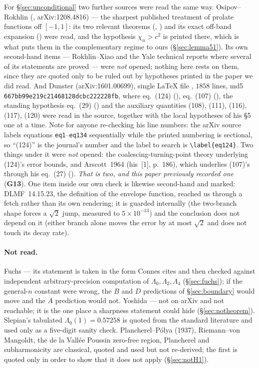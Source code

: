 \documentclass[11pt,a4paper]{article}
\theoremstyle{plain}
\theoremstyle{definition}
\theoremstyle{remark}
\newcommand{\file}[1]{\path{#1}}
\begin{document}
For \S\ref{sec:unconditional} two further sources were read the same way.
Osipov--Rokhlin \cite{OsipovRokhlin2013} (\file{test12_arxiv.tex},
arXiv:1208.4816) --- the sharpest published treatment of prolate functions off
$[-1,1]$: its two relevant theorems (\file{:2485}, \file{:2497}) and its exact
off-band expansion (\file{:4350}) were read, and the hypothesis
$\chi_n>c^2$ is printed there, which is what puts them in the complementary
regime to ours (\S\ref{sec:lemma51}).  Its own second-hand items --- Rokhlin--Xiao
and the Yale technical reports where several of its statements are proved ---
were \emph{not} opened; nothing here rests on them, since they are quoted only
to be ruled out by hypotheses printed in the paper we did read.  And Dunster
\cite{Dunster2017} (arXiv:1601.00699), single \LaTeX{} file
\file{PSWF_JCA.tex}, $1858$ lines, md5
\texttt{667bb99e219c21468128dcbc222228fb}, where eq.~(124) (\file{:1426}),
eq.~(107) (\file{:1296}), the standing hypothesis eq.~(29) (\file{:466}) and
the auxiliary quantities (108), (111), (116), (117), (120) were read in the
source, together with the local hypotheses of his \S5 one at a time.  Note for
anyone re-checking his line numbers: the arXiv source labels equations
\texttt{eq1}--\texttt{eq134} sequentially while the printed numbering is
sectional, so ``(124)'' is the journal's number and the label to search is
\verb|\label{eq124}|.  Two things under it were \emph{not} opened: the
coalescing-turning-point theory underlying (124)'s error bounds, and
Arscott~1964 (his~[1], p.~186), which underlies (107)'s through his eq.~(27)
(\file{:455}).  \emph{That is two, and this paper previously recorded one}
(\textbf{G13}).  One item inside our own check is likewise second-hand and
marked: DLMF~14.15.23, the definition of the envelope function, reached us
through a fetch rather than its own rendering; it is guarded internally (the
two-branch shape forces a $\sqrt2$ jump, measured to $5\times10^{-13}$) and the
conclusion does not depend on it (either branch alone moves the error by at
most $\sqrt2$ and does not touch its decay rate).

\paragraph{Not read.}  Fuchs \cite{Fuchs1964} --- its statement is taken in the
form Connes cites and then checked against independent arbitrary-precision
computation of $\Lambda_0,\Lambda_2,\Lambda_4$ (\S\ref{sec:fuchs}); if the
general-$n$ constant were wrong, the $B$ and $D$ predictions of
\S\ref{sec:boundary} would move and the $A$ prediction would not.  Yoshida
\cite{Yoshida1992} --- not on arXiv and not reachable; it is the one place a
sharpness statement could hide (\S\ref{sec:notheorem}).  Slepian's tabulated
$\Lambda_0(1)=0.57258$ is quoted from the standard literature and used only as a
five-digit sanity check.  Plancherel--P\'olya (1937), Riemann--von Mangoldt, the
de la Vall\'ee Poussin zero-free region, Plancherel and subharmonicity are
classical, quoted and used but not re-derived; the first is quoted only in order
to show that it does not apply (\S\ref{sec:notH1}).
\end{document}
